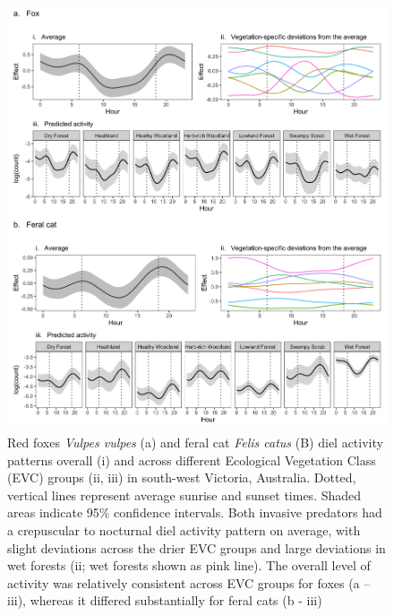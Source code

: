 \documentclass[11pt,a4paper,titlepage,twoside,openright]{style/unimelbthesis}
\begin{document}
\begin{mainmatter}
\begin{figure}
{\centering \includegraphics[width=1\linewidth]{figure/predator_veg} 

}

\caption{Red foxes \textit{Vulpes vulpes} (a) and feral cat \textit{Felis catus} (B) diel activity patterns overall (i) and across different Ecological Vegetation Class (EVC) groups (ii, iii) in south-west Victoria, Australia. Dotted, vertical lines represent average sunrise and sunset times. Shaded areas indicate 95\% confidence intervals. Both invasive predators had a crepuscular to nocturnal diel activity pattern on average, with slight deviations across the drier EVC groups and large deviations in wet forests (ii; wet forests shown as pink line). The overall level of activity was relatively consistent across EVC groups for foxes (a – iii), whereas it differed substantially for feral cats (b - iii)}\label{fig:diel-veg}
\end{figure}
\newpage
\begin{figure}


\end{figure}
\end{mainmatter}
\end{document}
